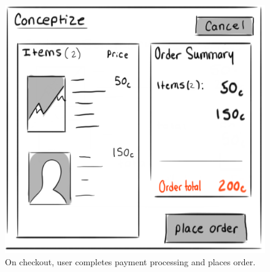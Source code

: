 \documentclass[]{article}
\begin{document}
\begin{enumerate}
		\begin{figure}
		  \includegraphics[width=\linewidth]{./pictures/checkout.png}
		  \caption{On checkout, user completes payment processing and places order.}
		  \label{fig:buyer5}
		\end{figure}
		

\end{enumerate}
\end{document}
